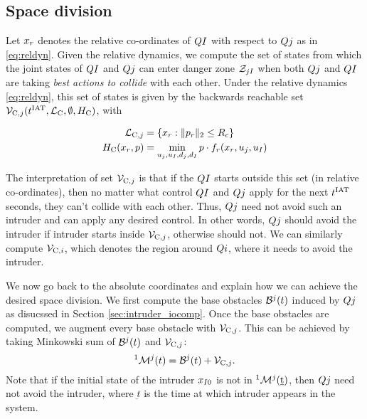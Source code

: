 \subsection{Space division} \label{sec:spaceDiv}
Let $x_r$ denotes the relative co-ordinates of $Q{I}$ with respect to $Q{j}$ as in \eqref{eq:reldyn}. Given the relative dynamics, we compute the set of states from which the joint states of $Q{I}$ and $Q{j}$ can enter danger zone $\mathcal{Z}_{jI}$ when both $Q{j}$ and $Q{I}$ are taking \textit{best actions to collide} with each other. Under the relative dynamics \eqref{eq:reldyn}, this set of states is given by the backwards reachable set $\mathcal{V}_{\text{C},j}(t^\text{IAT}, \mathcal{L}_\text{C}, \emptyset, H_\text{C})$, with

\begin{equation}
\begin{aligned}
\mathcal{L}_{\text{C},j} &= \{x_r: \|p_r\|_2 \le R_c\} \\
H_\text{C}(x_r, p) &= \min_{u_j, u_I, d_j, d_I} p \cdot f_r(x_r, u_j, u_I)
\end{aligned}
\end{equation}

The interpretation of set $\mathcal{V}_{\text{C},j}$ is that if the $Q{I}$ starts outside this set (in relative co-ordinates), then no matter what control $Q{I}$ and $Q{j}$ apply for the next $t^\text{IAT}$ seconds, they can't collide with each other. Thus, $Q{j}$ need not avoid such an intruder and can apply any desired control. In other words, $Q{j}$ should avoid the intruder if intruder starts inside $\mathcal{V}_{\text{C},j}$, otherwise should not. We can similarly compute $\mathcal{V}_{\text{C},i}$, which denotes the region around $Q{i}$, where it needs to avoid the intruder. 

We now go back to the absolute coordinates and explain how we can achieve the desired space division. We first compute the base obstacles $\mathcal{B}^j(t)$ induced by $Q{j}$ as disucssed in Section \ref{sec:intruder_iocomp}. Once the base obstacles are computed, we augment every base obstacle with $\mathcal{V}_{\text{C},j}$. This can be achieved by taking Minkowski sum of $\mathcal{B}^j(t)$ and $\mathcal{V}_{\text{C},j}$:
\begin{equation}
^1\mathcal{M}^j(t) = \mathcal{B}^j(t) + \mathcal{V}_{\text{C},j}.
\end{equation}
Note that if the initial state of the intruder $x_{I0}$ is not in $^1\mathcal{M}^j(\underbar{t})$, then $Q{j}$ need not avoid the intruder, where $\underbar{t}$ is the time at which intruder appears in the system.

